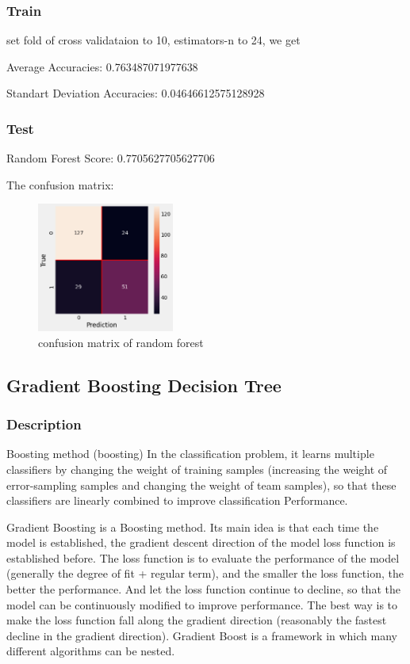 \documentclass[11pt,en]{elegantpaper}
\begin{document}
\subsubsection{Train}
set fold of cross validataion to 10, estimators-n to 24, we get

Average Accuracies:  0.763487071977638

Standart Deviation Accuracies:  0.04646612575128928

\subsubsection{Test}
Random Forest Score:  0.7705627705627706

The confusion matrix:
\begin{figure}[H]
    \centering
    \includegraphics[width=0.4\textwidth]{figure/conmat-rf.png}
    \caption{confusion matrix of random forest}
\end{figure}



\subsection{Gradient Boosting Decision Tree}
\subsubsection{Description}
Boosting method (boosting) In the classification problem, it learns multiple classifiers by changing the weight of training samples (increasing the weight of error-sampling samples and changing the weight of team samples), so that these classifiers are linearly combined to improve classification Performance. 

Gradient Boosting is a Boosting method. Its main idea is that each time the model is established, the gradient descent direction of the model loss function is established before. The loss function is to evaluate the performance of the model (generally the degree of fit + regular term), and the smaller the loss function, the better the performance. And let the loss function continue to decline, so that the model can be continuously modified to improve performance. The best way is to make the loss function fall along the gradient direction (reasonably the fastest decline in the gradient direction). Gradient Boost is a framework in which many different algorithms can be nested.
\end{document}
